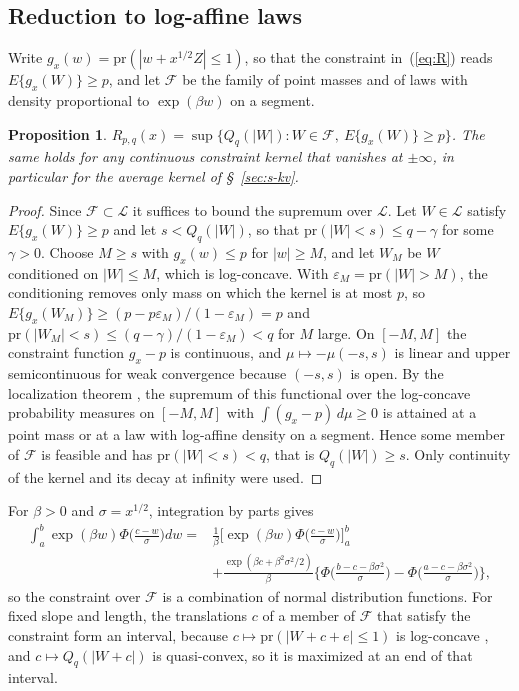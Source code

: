 \documentclass[12pt]{article}
\renewcommand{\_}{\usc\allowbreak}
\newtheorem{proposition}{Proposition}
\theoremstyle{definition}
\numberwithin{equation}{section}
\newcommand{\pr}{\mathrm{pr}}
\newcommand{\LC}{\mathcal{L}}
\begin{document}
\subsection{Reduction to log-affine laws}\label{sec:s-reduction}

Write $g_x(w) = \pr(|w + x^{1/2}Z| \le 1)$, so that the constraint in~(\ref{eq:R}) reads $E\{g_x(W)\} \ge p$, and let $\mathcal F$ be the family of point masses and of laws with density proportional to $\exp(\beta w)$ on a segment.

\begin{proposition}\label{prop:reduction}
$R_{p,q}(x) = \sup\{Q_q(|W|) : W \in \mathcal F,\ E\{g_x(W)\} \ge p\}$. The same holds for any continuous constraint kernel that vanishes at $\pm\infty$, in particular for the average kernel of \S~\ref{sec:s-kv}.
\end{proposition}

\begin{proof}
Since $\mathcal F \subset \LC$ it suffices to bound the supremum over $\LC$. Let $W \in \LC$ satisfy $E\{g_x(W)\} \ge p$ and let $s < Q_q(|W|)$, so that $\pr(|W| < s) \le q - \gamma$ for some $\gamma > 0$. Choose $M \ge s$ with $g_x(w) \le p$ for $|w| \ge M$, and let $W_M$ be $W$ conditioned on $|W| \le M$, which is log-concave. With $\varepsilon_M = \pr(|W| > M)$, the conditioning removes only mass on which the kernel is at most $p$, so $E\{g_x(W_M)\} \ge (p - p\varepsilon_M)/(1 - \varepsilon_M) = p$ and $\pr(|W_M| < s) \le (q - \gamma)/(1 - \varepsilon_M) < q$ for $M$ large. On $[-M, M]$ the constraint function $g_x - p$ is continuous, and $\mu \mapsto -\mu(-s, s)$ is linear and upper semicontinuous for weak convergence because $(-s, s)$ is open. By the localization theorem \citep*{kannan1995, fradelizi2004}, the supremum of this functional over the log-concave probability measures on $[-M, M]$ with $\int(g_x - p)\,d\mu \ge 0$ is attained at a point mass or at a law with log-affine density on a segment. Hence some member of $\mathcal F$ is feasible and has $\pr(|W| < s) < q$, that is $Q_q(|W|) \ge s$. Only continuity of the kernel and its decay at infinity were used.
\end{proof}

For $\beta > 0$ and $\sigma = x^{1/2}$, integration by parts gives
\begin{equation}\label{eq:closed}
\begin{split}
\int_a^b\exp(\beta w)\Phi\Big(\frac{c - w}{\sigma}\Big)dw ={}& \frac{1}{\beta}\Big[\exp(\beta w)\Phi\Big(\frac{c - w}{\sigma}\Big)\Big]_a^b \\
&+ \frac{\exp(\beta c + \beta^2\sigma^2/2)}{\beta}\Big\{\Phi\Big(\frac{b - c - \beta\sigma^2}{\sigma}\Big) - \Phi\Big(\frac{a - c - \beta\sigma^2}{\sigma}\Big)\Big\},
\end{split}
\end{equation}
so the constraint over $\mathcal F$ is a combination of normal distribution functions. For fixed slope and length, the translations $c$ of a member of $\mathcal F$ that satisfy the constraint form an interval, because $c \mapsto \pr(|W + c + e| \le 1)$ is log-concave \citep{prekopa1973}, and $c \mapsto Q_q(|W + c|)$ is quasi-convex, so it is maximized at an end of that interval.
\end{document}
